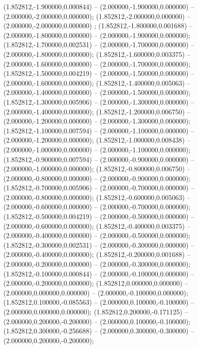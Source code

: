  (1.852812,-1.900000,0.000844) -- (2.000000,-1.900000,0.000000) -- (2.000000,-2.000000,0.000000);
 (1.852812,-2.000000,0.000000) -- (2.000000,-2.000000,0.000000) ;
 (1.852812,-1.800000,0.001688) -- (2.000000,-1.800000,0.000000) -- (2.000000,-1.900000,0.000000);
 (1.852812,-1.700000,0.002531) -- (2.000000,-1.700000,0.000000) -- (2.000000,-1.800000,0.000000);
 (1.852812,-1.600000,0.003375) -- (2.000000,-1.600000,0.000000) -- (2.000000,-1.700000,0.000000);
 (1.852812,-1.500000,0.004219) -- (2.000000,-1.500000,0.000000) -- (2.000000,-1.600000,0.000000);
 (1.852812,-1.400000,0.005063) -- (2.000000,-1.400000,0.000000) -- (2.000000,-1.500000,0.000000);
 (1.852812,-1.300000,0.005906) -- (2.000000,-1.300000,0.000000) -- (2.000000,-1.400000,0.000000);
 (1.852812,-1.200000,0.006750) -- (2.000000,-1.200000,0.000000) -- (2.000000,-1.300000,0.000000);
 (1.852812,-1.100000,0.007594) -- (2.000000,-1.100000,0.000000) -- (2.000000,-1.200000,0.000000);
 (1.852812,-1.000000,0.008438) -- (2.000000,-1.000000,0.000000) -- (2.000000,-1.100000,0.000000);
 (1.852812,-0.900000,0.007594) -- (2.000000,-0.900000,0.000000) -- (2.000000,-1.000000,0.000000);
 (1.852812,-0.800000,0.006750) -- (2.000000,-0.800000,0.000000) -- (2.000000,-0.900000,0.000000);
 (1.852812,-0.700000,0.005906) -- (2.000000,-0.700000,0.000000) -- (2.000000,-0.800000,0.000000);
 (1.852812,-0.600000,0.005063) -- (2.000000,-0.600000,0.000000) -- (2.000000,-0.700000,0.000000);
 (1.852812,-0.500000,0.004219) -- (2.000000,-0.500000,0.000000) -- (2.000000,-0.600000,0.000000);
 (1.852812,-0.400000,0.003375) -- (2.000000,-0.400000,0.000000) -- (2.000000,-0.500000,0.000000);
 (1.852812,-0.300000,0.002531) -- (2.000000,-0.300000,0.000000) -- (2.000000,-0.400000,0.000000);
 (1.852812,-0.200000,0.001688) -- (2.000000,-0.200000,0.000000) -- (2.000000,-0.300000,0.000000);
 (1.852812,-0.100000,0.000844) -- (2.000000,-0.100000,0.000000) -- (2.000000,-0.200000,0.000000);
 (1.852812,0.000000,0.000000) -- (2.000000,0.000000,0.000000) -- (2.000000,-0.100000,0.000000);
 (1.852812,0.100000,-0.085563) -- (2.000000,0.100000,-0.100000) -- (2.000000,0.000000,0.000000);
 (1.852812,0.200000,-0.171125) -- (2.000000,0.200000,-0.200000) -- (2.000000,0.100000,-0.100000);
 (1.852812,0.300000,-0.256688) -- (2.000000,0.300000,-0.300000) -- (2.000000,0.200000,-0.200000);
